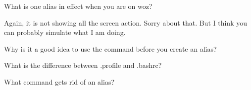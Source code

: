 \documentclass[letterpaper,12pt]{exam}
\begin{document}
\begin {questions}
\begin{samepage}
\question What is one alias in effect when you are on woz? 
\vspace{5mm}
\end{samepage}


\noindent Again, it is not showing all the screen action.  Sorry about that.  But I think you can probably simulate what I am doing.


\begin{samepage}
\question Why is it a good idea to use the  command before you create an alias? 

\begin{samepage}
\question What is the difference between .profile and .bashrc? 
\vspace{5mm}
\end{samepage}
\end{samepage}

\begin{samepage}
\question What command gets rid of an alias? 
\vspace{5mm}
\end{samepage}

\end{questions}
\end{document}
